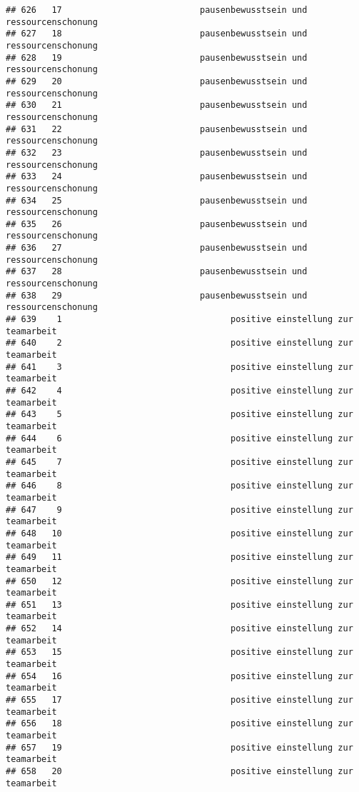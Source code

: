 \documentclass[
]{article}
\begin{document}
\begin{verbatim}
## 626   17                           pausenbewusstsein und ressourcenschonung 
## 627   18                           pausenbewusstsein und ressourcenschonung 
## 628   19                           pausenbewusstsein und ressourcenschonung 
## 629   20                           pausenbewusstsein und ressourcenschonung 
## 630   21                           pausenbewusstsein und ressourcenschonung 
## 631   22                           pausenbewusstsein und ressourcenschonung 
## 632   23                           pausenbewusstsein und ressourcenschonung 
## 633   24                           pausenbewusstsein und ressourcenschonung 
## 634   25                           pausenbewusstsein und ressourcenschonung 
## 635   26                           pausenbewusstsein und ressourcenschonung 
## 636   27                           pausenbewusstsein und ressourcenschonung 
## 637   28                           pausenbewusstsein und ressourcenschonung 
## 638   29                           pausenbewusstsein und ressourcenschonung 
## 639    1                                 positive einstellung zur teamarbeit
## 640    2                                 positive einstellung zur teamarbeit
## 641    3                                 positive einstellung zur teamarbeit
## 642    4                                 positive einstellung zur teamarbeit
## 643    5                                 positive einstellung zur teamarbeit
## 644    6                                 positive einstellung zur teamarbeit
## 645    7                                 positive einstellung zur teamarbeit
## 646    8                                 positive einstellung zur teamarbeit
## 647    9                                 positive einstellung zur teamarbeit
## 648   10                                 positive einstellung zur teamarbeit
## 649   11                                 positive einstellung zur teamarbeit
## 650   12                                 positive einstellung zur teamarbeit
## 651   13                                 positive einstellung zur teamarbeit
## 652   14                                 positive einstellung zur teamarbeit
## 653   15                                 positive einstellung zur teamarbeit
## 654   16                                 positive einstellung zur teamarbeit
## 655   17                                 positive einstellung zur teamarbeit
## 656   18                                 positive einstellung zur teamarbeit
## 657   19                                 positive einstellung zur teamarbeit
## 658   20                                 positive einstellung zur teamarbeit

\end{verbatim}
\end{document}
